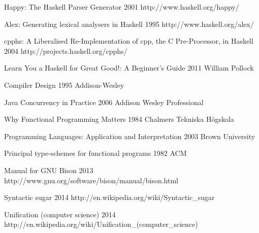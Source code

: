 
\begingroup
\renewcommand{\section}[2]{}%

\begin{thebibliography}{99}

  {Happy: The Haskell Parser Generator}
  {2001}
  {http://www.haskell.org/happy/}

  {Alex: Generating lexical analysers in Haskell}
  {1995}
  {http://www.haskell.org/alex/}

  {cpphs: A Liberalised Re-Implementation of cpp, the C Pre-Processor, in Haskell}
  {2004}
  {http://projects.haskell.org/cpphs/}

  {Learn You a Haskell for Great Good!: A Beginner's Guide}
  {2011}
  {William Pollock}

  {Compiler Design}
  {1995}
  {Addison-Wesley}

  {Java Concurrency in Practice}
  {2006}
  {Addison Wesley Professional}

  {Why Functional Programming Matters}
  {1984}
  {Chalmers Tekniska Högskola}

  {Programming Languages: Application and Interpretation}
  {2003}
  {Brown University}

  {Principal type-schemes for functional programs}
  {1982}
  {ACM}

  {Manual for GNU Bison }
  {2013}
  {http://www.gnu.org/software/bison/manual/bison.html}

  {Syntactic sugar}
  {2014}
  {http://en.wikipedia.org/wiki/Syntactic_sugar}


  {Unification (computer science)}
  {2014}
  {http://en.wikipedia.org/wiki/Unification_(computer_science)}


\end{thebibliography}

\endgroup